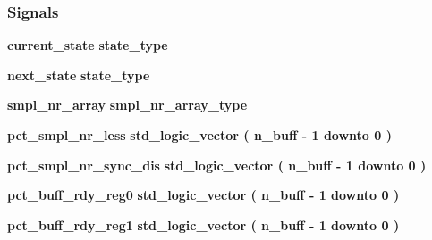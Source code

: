 \subsubsection*{Signals}
 \begin{DoxyCompactItemize}
\item 
{\bf current\+\_\+state} {\bfseries {\bfseries {\bf state\+\_\+type}} \textcolor{vhdlchar}{ }} 
\item 
{\bf next\+\_\+state} {\bfseries {\bfseries {\bf state\+\_\+type}} \textcolor{vhdlchar}{ }} 
\item 
{\bf smpl\+\_\+nr\+\_\+array} {\bfseries {\bfseries {\bf smpl\+\_\+nr\+\_\+array\+\_\+type}} \textcolor{vhdlchar}{ }} 
\item 
{\bf pct\+\_\+smpl\+\_\+nr\+\_\+less} {\bfseries \textcolor{comment}{std\+\_\+logic\+\_\+vector}\textcolor{vhdlchar}{ }\textcolor{vhdlchar}{(}\textcolor{vhdlchar}{ }\textcolor{vhdlchar}{ }\textcolor{vhdlchar}{ }\textcolor{vhdlchar}{ }{\bfseries {\bf n\+\_\+buff}} \textcolor{vhdlchar}{-\/}\textcolor{vhdlchar}{ } \textcolor{vhdldigit}{1} \textcolor{vhdlchar}{ }\textcolor{keywordflow}{downto}\textcolor{vhdlchar}{ }\textcolor{vhdlchar}{ } \textcolor{vhdldigit}{0} \textcolor{vhdlchar}{ }\textcolor{vhdlchar}{)}\textcolor{vhdlchar}{ }} 
\item 
{\bf pct\+\_\+smpl\+\_\+nr\+\_\+sync\+\_\+dis} {\bfseries \textcolor{comment}{std\+\_\+logic\+\_\+vector}\textcolor{vhdlchar}{ }\textcolor{vhdlchar}{(}\textcolor{vhdlchar}{ }\textcolor{vhdlchar}{ }\textcolor{vhdlchar}{ }\textcolor{vhdlchar}{ }{\bfseries {\bf n\+\_\+buff}} \textcolor{vhdlchar}{-\/}\textcolor{vhdlchar}{ } \textcolor{vhdldigit}{1} \textcolor{vhdlchar}{ }\textcolor{keywordflow}{downto}\textcolor{vhdlchar}{ }\textcolor{vhdlchar}{ } \textcolor{vhdldigit}{0} \textcolor{vhdlchar}{ }\textcolor{vhdlchar}{)}\textcolor{vhdlchar}{ }} 
\item 
{\bf pct\+\_\+buff\+\_\+rdy\+\_\+reg0} {\bfseries \textcolor{comment}{std\+\_\+logic\+\_\+vector}\textcolor{vhdlchar}{ }\textcolor{vhdlchar}{(}\textcolor{vhdlchar}{ }\textcolor{vhdlchar}{ }\textcolor{vhdlchar}{ }\textcolor{vhdlchar}{ }{\bfseries {\bf n\+\_\+buff}} \textcolor{vhdlchar}{-\/}\textcolor{vhdlchar}{ } \textcolor{vhdldigit}{1} \textcolor{vhdlchar}{ }\textcolor{keywordflow}{downto}\textcolor{vhdlchar}{ }\textcolor{vhdlchar}{ } \textcolor{vhdldigit}{0} \textcolor{vhdlchar}{ }\textcolor{vhdlchar}{)}\textcolor{vhdlchar}{ }} 
\item 
{\bf pct\+\_\+buff\+\_\+rdy\+\_\+reg1} {\bfseries \textcolor{comment}{std\+\_\+logic\+\_\+vector}\textcolor{vhdlchar}{ }\textcolor{vhdlchar}{(}\textcolor{vhdlchar}{ }\textcolor{vhdlchar}{ }\textcolor{vhdlchar}{ }\textcolor{vhdlchar}{ }{\bfseries {\bf n\+\_\+buff}} \textcolor{vhdlchar}{-\/}\textcolor{vhdlchar}{ } \textcolor{vhdldigit}{1} \textcolor{vhdlchar}{ }\textcolor{keywordflow}{downto}\textcolor{vhdlchar}{ }\textcolor{vhdlchar}{ } \textcolor{vhdldigit}{0} \textcolor{vhdlchar}{ }\textcolor{vhdlchar}{)}\textcolor{vhdlchar}{ }} 

\end{DoxyCompactItemize}
